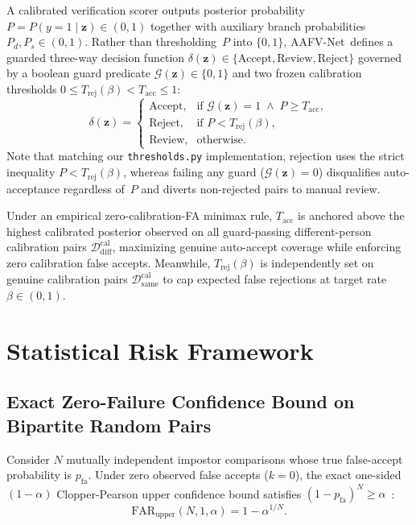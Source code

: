 \documentclass[journal]{IEEEtran}
\newcommand{\sys}{AAFV-Net}
\newcommand{\vect}[1]{\mathbf{#1}}
\begin{document}
A calibrated verification scorer outputs posterior probability $P = P(y=1 \mid \vect{z}) \in (0, 1)$ together with auxiliary branch probabilities $P_d, P_s \in (0, 1)$. Rather than thresholding~$P$ into $\{0, 1\}$, \sys\ defines a guarded three-way decision function $\delta(\vect{z}) \in \{\text{Accept}, \text{Review}, \text{Reject}\}$ governed by a boolean guard predicate $\mathcal{G}(\vect{z}) \in \{0, 1\}$ and two frozen calibration thresholds $0 \le T_{\text{rej}}(\beta) < T_{\text{acc}} \le 1$:
\begin{equation}
\label{eq:decision_rule}
\delta(\vect{z}) =
\begin{cases}
\text{Accept}, & \text{if } \mathcal{G}(\vect{z}) = 1 \;\land\; P \ge T_{\text{acc}}, \\
\text{Reject}, & \text{if } P < T_{\text{rej}}(\beta), \\
\text{Review}, & \text{otherwise.}
\end{cases}
\end{equation}
Note that matching our \texttt{thresholds.py} implementation, rejection uses the strict inequality $P < T_{\text{rej}}(\beta)$, whereas failing any guard ($\mathcal{G}(\vect{z}) = 0$) disqualifies auto-acceptance regardless of~$P$ and diverts non-rejected pairs to manual review.

Under an empirical zero-calibration-FA minimax rule, $T_{\text{acc}}$ is anchored above the highest calibrated posterior observed on all guard-passing different-person calibration pairs $\mathcal{D}_{\text{diff}}^{\text{cal}}$, maximizing genuine auto-accept coverage while enforcing zero calibration false accepts. Meanwhile, $T_{\text{rej}}(\beta)$ is independently set on genuine calibration pairs $\mathcal{D}_{\text{same}}^{\text{cal}}$ to cap expected false rejections at target rate~$\beta \in (0, 1)$.

\section{Statistical Risk Framework}
\label{sec:statistics}

\subsection{Exact Zero-Failure Confidence Bound on Bipartite Random Pairs}
Consider $N$ mutually independent impostor comparisons whose true false-accept probability is $p_{\text{fa}}$. Under zero observed false accepts ($k = 0$), the exact one-sided $(1-\alpha)$ Clopper-Pearson upper confidence bound satisfies $(1 - p_{\text{fa}})^N \ge \alpha$~\cite{clopper1934,hanley1983rule3}:
\begin{equation}
\label{eq:cp_bound}
\text{FAR}_{\text{upper}}(N, 1, \alpha) = 1 - \alpha^{1/N}.
\end{equation}
\end{document}
